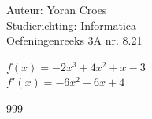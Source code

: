 \documentclass[a4paper]{article}
\begin{document}
\noindent \large Auteur: Yoran Croes \\
\noindent \large Studierichting: Informatica\\
\noindent \large Oefeningenreeks 3A nr. 8.21\\

\medskip

\normalsize

$f(x) = -2x^3 +4x^2 +x -3$ \\

$f'(x) = -6x^2 - 6x + 4$ \\


\begin{thebibliography}{999}
\end{thebibliography}
\end{document}
